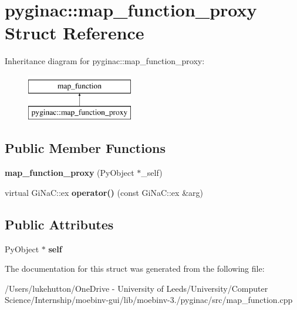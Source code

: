 \hypertarget{structpyginac_1_1map__function__proxy}{}\section{pyginac\+:\+:map\+\_\+function\+\_\+proxy Struct Reference}
\label{structpyginac_1_1map__function__proxy}
Inheritance diagram for pyginac\+:\+:map\+\_\+function\+\_\+proxy\+:\begin{figure}[H]
\begin{center}
\leavevmode
\includegraphics[height=2.000000cm]{structpyginac_1_1map__function__proxy}
\end{center}
\end{figure}
\subsection*{Public Member Functions}
\begin{DoxyCompactItemize}
\item 
\mbox{\label{structpyginac_1_1map__function__proxy_a458fb20352a9bdfa393e45eb1b1e9b1e}} 
{\bfseries map\+\_\+function\+\_\+proxy} (Py\+Object $\ast$\+\_\+self)
\item 
\mbox{\label{structpyginac_1_1map__function__proxy_aba7abc33e82832dbb5050994e4e5ca51}} 
virtual Gi\+Na\+C\+::ex {\bfseries operator()} (const Gi\+Na\+C\+::ex \&arg)
\end{DoxyCompactItemize}
\subsection*{Public Attributes}
\begin{DoxyCompactItemize}
\item 
\mbox{\label{structpyginac_1_1map__function__proxy_ad736211c6c987a875512ab1f48c5f62d}} 
Py\+Object $\ast$ {\bfseries self}
\end{DoxyCompactItemize}


The documentation for this struct was generated from the following file\+:\begin{DoxyCompactItemize}
\item 
/\+Users/lukehutton/\+One\+Drive -\/ University of Leeds/\+University/\+Computer Science/\+Internship/moebinv-\/gui/lib/moebinv-\/3./pyginac/src/map\+\_\+function.\+cpp\end{DoxyCompactItemize}
